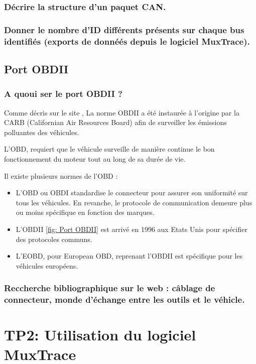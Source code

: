 \documentclass{rapportECC}
\begin{document}
\subsubsection*{Décrire la structure d'un paquet CAN.}

\subsubsection*{Donner le nombre d'ID différents présents sur chaque bus identifiés (exports de donnéés depuis le logiciel MuxTrace).}

\subsection{Port OBDII}

\subsubsection*{A quoui ser le port OBDII ?}

Comme décris sur le site \cite{klavkarr}, La norme OBDII a été instaurée à l'origine par la CARB (Californian Air Resources Board) afin de surveiller les émissions polluantes des véhicules.  

L'OBD, requiert que le véhicule surveille de manière continue le bon fonctionnement du moteur tout au long de sa durée de vie.

Il existe plusieurs normes de l'OBD : 
\begin{itemize}
    \item L'OBD ou OBDI standardise le connecteur pour assurer son uniformité sur tous les véhicules. En revanche, le protocole de communication demeure plus ou moins spécifique en fonction des marques.
    \item L'OBDII \ref{fig: Port OBDII} est arrivé en 1996 aux Etats Unis pour spécifier des protocoles communs.
    \item L'EOBD, pour European OBD, reprenant l'OBDII est spécifique pour les véhicules européens.
\end{itemize}
    
\subsubsection*{Reccherche bibliographique sur le web : câblage de connecteur, monde d'échange entre les outils et le véhicle.}

\section{TP2: Utilisation du logiciel MuxTrace}
\end{document}
